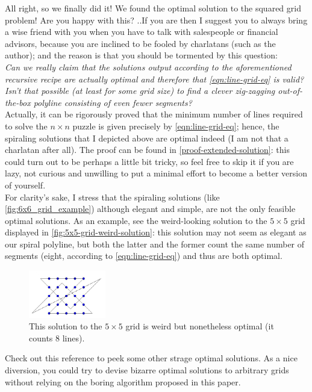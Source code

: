 \documentclass[11pt]{article}
\begin{document}
All right, so we finally did it! We found the optimal solution to the squared grid problem! Are you happy with this? ..If you are then I suggest you to always bring a wise friend with you when you have to talk with salespeople or financial advisors, because you are inclined to be fooled by charlatans (such as the author); and the reason is that you should be tormented by this question:\\
\emph{Can we really claim that the solutions output according to the aforementioned recursive recipe are actually optimal and therefore that \autoref{eqn:line-grid-eq} is valid? Isn't that possible (at least for some grid size) to find a clever zig-zagging out-of-the-box polyline consisting of even fewer segments?}\\
Actually, it can be rigorously proved that the minimum number of lines required to solve the $n \times n$ puzzle is given precisely by \autoref{eqn:line-grid-eq}; hence, the spiraling solutions that I depicted above are optimal indeed (I am not that a charlatan after all). The proof can be found in \autoref{proof-extended-solution}: this could turn out to be perhaps a little bit tricky, so feel free to skip it if you are lazy, not curious and unwilling to put a minimal effort to become a better version of yourself.\\
For clarity's sake, I stress that the spiraling solutions (like \autoref{fig:6x6_grid_example}) although elegant and simple, are not the only feasible optimal solutions. As an example, see the weird-looking solution to the $5 \times 5$ grid displayed in \autoref{fig:5x5-grid-weird-solution}: this solution\cite{math-puzzles-site} may not seem as elegant as our spiral polyline, but both the latter and the former count the same number of segments (eight, according to \autoref{eqn:line-grid-eq}) and thus are both optimal.
\begin{figure}[H]
\centering
\includegraphics[width=0.3\textwidth]{images/5x5-grid-weird-solution.png}
\caption{This solution to the $5\times 5$ grid\cite{math-puzzles-site} is weird but nonetheless optimal (it counts 8 lines).}
\label{fig:5x5-grid-weird-solution}
\end{figure}
Check out this reference\cite{math-puzzles-site} to peek some other strage optimal solutions. As a nice diversion, you could try to devise bizarre optimal solutions to arbitrary grids without relying on the boring algorithm proposed in this paper.
\end{document}
